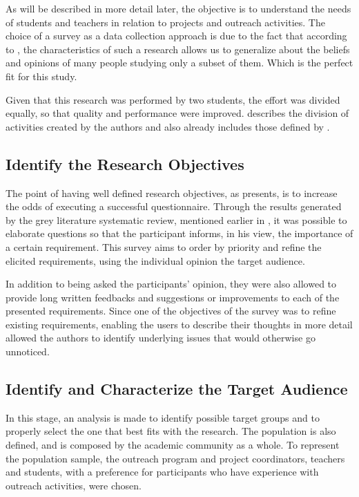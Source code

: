 As will be described in more detail later, the objective is to understand the needs of students and teachers in relation to projects and outreach activities. The choice of a survey as a data collection approach is due to the fact that according to , the characteristics of such a research allows us to generalize about the beliefs and opinions of many people studying only a subset of them. Which is the perfect fit for this study.

Given that this research was performed by two students, the effort was divided equally, so that quality and performance were improved.  describes the division of activities created by the authors and also already includes those defined by .



\subsection{Identify the Research Objectives}\label{sec:survey-objectives}

The point of having well defined research objectives, as  presents, is to increase the odds of executing a successful questionnaire. Through the results generated by the grey literature systematic review, mentioned earlier in , it was possible to elaborate questions so that the participant informs, in his view, the importance of a certain requirement. This survey aims to order by priority and refine the elicited requirements, using the individual opinion the target audience.

In addition to being asked the participants' opinion, they were also allowed to provide long written feedbacks and suggestions or improvements to each of the presented requirements. Since one of the objectives of the survey was to refine existing requirements, enabling the users to describe their thoughts in more detail allowed the authors to identify underlying issues that would otherwise go unnoticed.

\subsection{Identify and Characterize the Target Audience}\label{sec:survey-targets}

In this stage, an analysis is made to identify possible target groups and to properly select the one that best fits with the research. The population is also defined, and is composed by the academic community as a whole. To represent the population sample, the outreach program and project coordinators, teachers and students, with a preference for participants who have experience with outreach activities, were chosen.

